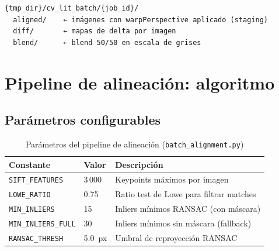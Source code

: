 \begin{codebox}[]
\begin{verbatim}
{tmp_dir}/cv_lit_batch/{job_id}/
  aligned/    ← imágenes con warpPerspective aplicado (staging)
  diff/       ← mapas de delta por imagen
  blend/      ← blend 50/50 en escala de grises
\end{verbatim}
\end{codebox}

\section{Pipeline de alineación: algoritmo}

\subsection{Parámetros configurables}

\begin{table}[H]
\centering
\caption{Parámetros del pipeline de alineación (\texttt{batch\_alignment.py})}
\label{tab:align-params}
\begin{tabular}{L{4cm} C{2.5cm} L{6cm}}
\toprule
\textbf{Constante} & \textbf{Valor} & \textbf{Descripción} \\
\midrule
\texttt{SIFT\_FEATURES}   & 3\,000 & Keypoints máximos por imagen \\
\texttt{LOWE\_RATIO}      & 0.75   & Ratio test de Lowe para filtrar matches \\
\texttt{MIN\_INLIERS}     & 15     & Inliers mínimos RANSAC (con máscara) \\
\texttt{MIN\_INLIERS\_FULL} & 30   & Inliers mínimos sin máscara (fallback) \\
\texttt{RANSAC\_THRESH}   & 5.0~px & Umbral de reproyección RANSAC \\
\bottomrule
\end{tabular}
\end{table}

